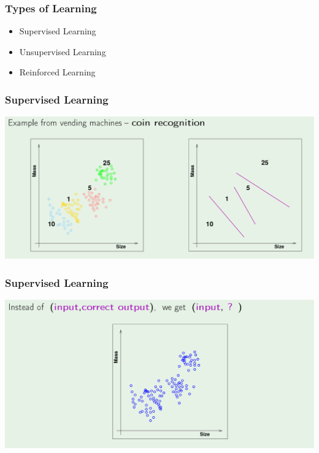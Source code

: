 \documentclass[xcolor=table]{beamer}
\begin{document}
\begin{frame}[t]
\frametitle{Types of Learning}
\begin{itemize}
    \item Supervised Learning
    \item Unsupervised Learning
    \item Reinforced Learning 
\end{itemize}
\end{frame}

\begin{frame}[t]
\frametitle{Supervised Learning}
\begin{center}
\includegraphics[scale=0.22]{supervised_learning.png}
\end{center}
\end{frame}

\begin{frame}[t]
\frametitle{Supervised Learning}
\begin{center}
\includegraphics[scale=0.22]{unsupervised_learning.png}
\end{center}
\end{frame}
\end{document}
